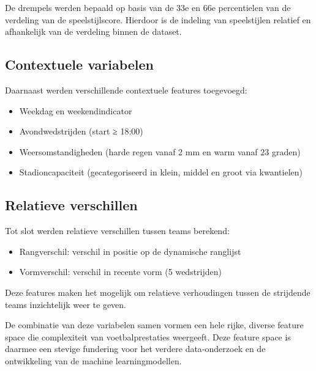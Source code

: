 De drempels werden bepaald op basis van de 33e en 66e percentielen van de verdeling van de speelstijlscore. 
Hierdoor is de indeling van speelstijlen relatief en afhankelijk van de verdeling binnen de dataset.

\vspace{5pt}

\subsection{Contextuele variabelen}

Daarnaast werden verschillende contextuele features toegevoegd:

\begin{itemize}
    \item Weekdag en weekendindicator
    \item Avondwedstrijden (start ≥ 18:00)
    \item Weersomstandigheden (harde regen vanaf 2 mm en warm vanaf 23 graden)
    \item Stadioncapaciteit (gecategoriseerd in klein, middel en groot via kwantielen)
\end{itemize}

\vspace{5pt}

\subsection{Relatieve verschillen}

Tot slot werden relatieve verschillen tussen teams berekend:

\begin{itemize}
    \item Rangverschil: verschil in positie op de dynamische ranglijst
    \item Vormverschil: verschil in recente vorm (5 wedstrijden)
\end{itemize}

Deze features maken het mogelijk om relatieve verhoudingen tussen de strijdende teams inzichtelijk weer te geven.

\vspace{5pt}

De combinatie van deze variabelen samen vormen een hele rijke, diverse feature space die complexiteit van voetbalprestaties weergeeft. 
Deze feature space is daarmee een stevige fundering voor het verdere data‐onderzoek en de ontwikkeling van de machine learningmodellen.